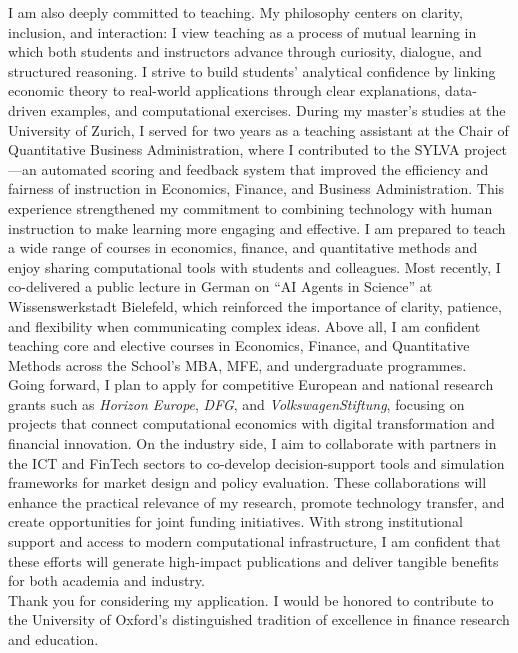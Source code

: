 \documentclass{nfr}
\begin{document}
I am also deeply committed to teaching. My philosophy centers on clarity, inclusion, and interaction: I view teaching as a process of mutual learning in which both students and instructors advance through curiosity, dialogue, and structured reasoning. I strive to build students’ analytical confidence by linking economic theory to real-world applications through clear explanations, data-driven examples, and computational exercises. During my master’s studies at the University of Zurich, I served for two years as a teaching assistant at the Chair of Quantitative Business Administration, where I contributed to the SYLVA project—an automated scoring and feedback system that improved the efficiency and fairness of instruction in Economics, Finance, and Business Administration. This experience strengthened my commitment to combining technology with human instruction to make learning more engaging and effective. I am prepared to teach a wide range of courses in economics, finance, and quantitative methods and enjoy sharing computational tools with students and colleagues. Most recently, I co-delivered a public lecture in German on “AI Agents in Science” at Wissenswerkstadt Bielefeld, which reinforced the importance of clarity, patience, and flexibility when communicating complex ideas. 
Above all, I am confident teaching core and elective courses in Economics, Finance, and Quantitative Methods across the School’s MBA, MFE, and undergraduate programmes.\\

Going forward, I plan to apply for competitive European and national research grants such as \textit{Horizon Europe}, \textit{DFG}, and \textit{VolkswagenStiftung}, focusing on projects that connect computational economics with digital transformation and financial innovation. On the industry side, I aim to collaborate with partners in the ICT and FinTech sectors to co-develop decision-support tools and simulation frameworks for market design and policy evaluation. These collaborations will enhance the practical relevance of my research, promote technology transfer, and create opportunities for joint funding initiatives. With strong institutional support and access to modern computational infrastructure, I am confident that these efforts will generate high-impact publications and deliver tangible benefits for both academia and industry.\\

Thank you for considering my application. 
I would be honored to contribute to the University of Oxford’s distinguished tradition of excellence in finance research and education.\\
\vspace{10mm}
\end{document}

